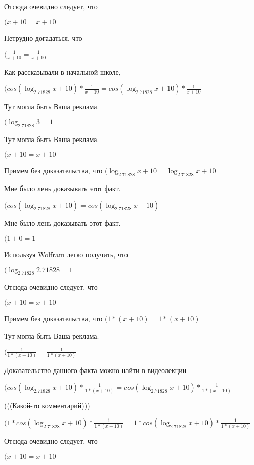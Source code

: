 \documentclass[12pt,a4paper,fleqn]{article}
\theoremstyle{definition}
\begin{document}
Отсюда очевидно следует, что

$( x  +  10  =  x  +  10 $

Нетрудно догадаться, что

$(\frac{ 1 }{ x  +  10 }
 = \frac{ 1 }{ x  +  10 }
$

Как рассказывали в начальной школе,

$(cos(\log_{ 2.71828 }{ x  +  10 }) * \frac{ 1 }{ x  +  10 }
 = cos(\log_{ 2.71828 }{ x  +  10 }) * \frac{ 1 }{ x  +  10 }
$

Тут могла быть Ваша реклама.

$(\log_{ 2.71828 }{ 3 } =  1 $

Тут могла быть Ваша реклама.

$( x  +  10  =  x  +  10 $

Примем без доказательства, что
$(\log_{ 2.71828 }{ x  +  10 } = \log_{ 2.71828 }{ x  +  10 }$

Мне было лень доказывать этот факт.

$(cos(\log_{ 2.71828 }{ x  +  10 }) = cos(\log_{ 2.71828 }{ x  +  10 })$

Мне было лень доказывать этот факт.

$( 1  +  0  =  1 $

Используя Wolfram легко получить, что

$(\log_{ 2.71828 }{ 2.71828 } =  1 $

Отсюда очевидно следует, что

$( x  +  10  =  x  +  10 $

Примем без доказательства, что
$( 1  * ( x  +  10 ) =  1  * ( x  +  10 )$

Тут могла быть Ваша реклама.

$(\frac{ 1 }{ 1  * ( x  +  10 )}
 = \frac{ 1 }{ 1  * ( x  +  10 )}
$

Доказательство данного факта можно найти в \href{https://www.youtube.com/watch?v=dQw4w9WgXcQ}{видеолекции}

$(cos(\log_{ 2.71828 }{ x  +  10 }) * \frac{ 1 }{ 1  * ( x  +  10 )}
 = cos(\log_{ 2.71828 }{ x  +  10 }) * \frac{ 1 }{ 1  * ( x  +  10 )}
$

(((Какой-то комментарий)))

$( 1  * cos(\log_{ 2.71828 }{ x  +  10 }) * \frac{ 1 }{ 1  * ( x  +  10 )}
 =  1  * cos(\log_{ 2.71828 }{ x  +  10 }) * \frac{ 1 }{ 1  * ( x  +  10 )}
$

Отсюда очевидно следует, что

$( x  +  10  =  x  +  10 $
\end{document}
